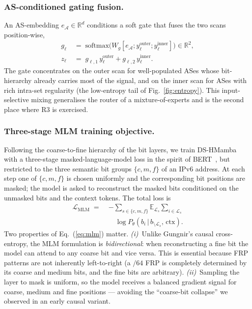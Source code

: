 \documentclass[conference]{IEEEtran}
\begin{document}
\subsubsection{AS-conditioned gating fusion.}
An AS-embedding $e_{\mathcal{A}}\!\in\!\mathbb{R}^{d}$
conditions a soft gate that fuses the two scans position-wise,
\begin{equation}
\begin{aligned}
g_{\ell} \;&=\; \mathrm{softmax}\!\bigl(W_g[e_{\mathcal{A}};
   y^{\text{outer}}_{\ell};y^{\text{inner}}_{\ell}]\bigr)
   \in\mathbb{R}^{2},\\
z_{\ell} \;&=\; g_{\ell,1}\,y^{\text{outer}}_{\ell}
             + g_{\ell,2}\,y^{\text{inner}}_{\ell}.
\end{aligned}
\label{eq:gate}
\end{equation}
The gate concentrates on the outer scan for well-populated
ASes whose bit-hierarchy already carries most of the signal,
and on the inner scan for ASes with rich intra-set regularity
(the low-entropy tail of Fig.~\ref{fig:entropy}).  This
input-selective mixing generalises the router of a
mixture-of-experts and is the second place where R3 is
exercised.

\subsubsection{Three-stage MLM training objective.}
Following the coarse-to-fine hierarchy of the bit layers, we
train DS-HMamba with a three-stage masked-language-model loss
in the spirit of BERT~\cite{devlin2019bert}, but restricted to
the three semantic bit groups $\{c,m,f\}$ of an IPv6 address.
At each step one of $\{c,m,f\}$ is chosen uniformly and the
corresponding bit positions are masked; the model is asked to
reconstruct the masked bits conditioned on the unmasked bits
and the context tokens.  The total loss is
\begin{equation}
\begin{split}
\mathcal{L}_{\mathrm{MLM}}
\;=\;& -\!\!\sum_{s\in\{c,m,f\}}\!
   \mathbb{E}_{\mathcal{L}_s}\!\!\sum_{i\in\mathcal{L}_s}\\
&\quad
\log P_\theta\!\left(b_i \,\big|\, b_{\setminus \mathcal{L}_s},\,\text{ctx}\right).
\end{split}
\label{eq:mlm}
\end{equation}
Two properties of Eq.~(\ref{eq:mlm}) matter.
\emph{(i)}~Unlike Gungnir's causal cross-entropy, the MLM
formulation is \emph{bidirectional}: when reconstructing a
fine bit the model can attend to any coarse bit and vice
versa.  This is essential because FRP patterns are not
inherently left-to-right (a $/64$ FRP is completely determined
by its coarse and medium bits, and the fine bits are
arbitrary).
\emph{(ii)}~Sampling the layer to mask is uniform, so the
model receives a balanced gradient signal for coarse, medium
and fine positions --- avoiding the ``coarse-bit collapse''
we observed in an early causal variant.
\end{document}
